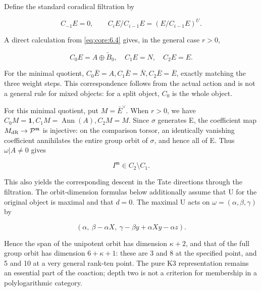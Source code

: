 \documentclass[11pt,a4paper,oneside]{article}
\theoremstyle{plain}
\theoremstyle{definition}
\theoremstyle{remark}
\numberwithin{equation}{section}
\begin{document}
Define the standard coradical filtration by

\begin{equation}
C_{-1}E=0,\qquad C_iE/C_{i-1}E=(E/C_{i-1}E)^U.
\end{equation}

A direct calculation from \eqref{eq:core:6.4} gives, in the general case \(r>0\),

\begin{equation}
C_0E=A\oplus\widetilde B_0,\quad C_1E=N,\quad C_2E=E.
                                                               \label{eq:coaction:9.3}
\end{equation}

For the minimal quotient, \(C_0\bar E=A,C_1\bar E=\bar N,C_2\bar E=\bar E\), exactly matching the three weight steps. This correspondence follows from the actual action and is not a general rule for mixed objects: for a split object, \(C_0\) is the whole object.

For this minimal quotient, put \(M=\bar E^\vee\). When \(r>0\), we have \(C_0M=\mathbf1,C_1M=\operatorname{Ann}(A),C_2M=M\). Since \(\sigma \) generates E, the coefficient map \(M_{\rm dR}\to\mathcal P^{\mathfrak m}\) is injective: on the comparison torsor, an identically vanishing coefficient annihilates the entire group orbit of \(\sigma \), and hence all of E. Thus \(\omega|A\ne0\) gives

\begin{equation}
I^{\mathfrak m}\in C_2\setminus C_1. 
                                                               \label{eq:coaction:9.4}
\end{equation}

This also yields the corresponding descent in the Tate directions through the filtration. The orbit-dimension formulas below additionally assume that U for the original object is maximal and that \(d=0\). The maximal U acts on \(\omega=(\alpha,\beta,\gamma)\) by

\begin{equation}
(\alpha,\ \beta-\alpha X,\ \gamma-\beta y+\alpha Xy-\alpha z).
\end{equation}

Hence the span of the unipotent orbit has dimension \(\kappa +2\), and that of the full group orbit has dimension \(6+\kappa +1\): these are 3 and 8 at the specified point, and 5 and 10 at a very general rank-ten point. The pure K3 representation remains an essential part of the coaction; depth two is not a criterion for membership in a polylogarithmic category.
\end{document}
